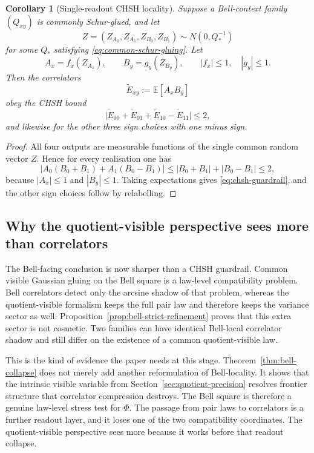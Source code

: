 \documentclass[11pt]{article}
\numberwithin{equation}{section}
\theoremstyle{thmcompact}
\newtheorem{corollary}[theorem]{Corollary}
\theoremstyle{remark}
\begin{document}
\begin{corollary}[Single-readout CHSH locality]\label{cor:chsh-guardrail}
Suppose a Bell-context family $(Q_{xy})$ is commonly Schur-glued, and let
\[
Z=(Z_{A_0},Z_{A_1},Z_{B_0},Z_{B_1})\sim N(0,Q_\ast^{-1})
\]
for some $Q_\ast$ satisfying \eqref{eq:common-schur-gluing}. Let
\[
A_x=f_x(Z_{A_x}),\qquad B_y=g_y(Z_{B_y}),
\qquad |f_x|\le 1,\quad |g_y|\le 1.
\]
Then the correlators
\[
\widetilde E_{xy}:=\mathbb E[A_xB_y]
\]
obey the CHSH bound
\begin{equation}\label{eq:chsh-guardrail}
\bigl|\widetilde E_{00}+\widetilde E_{01}+\widetilde E_{10}-\widetilde E_{11}\bigr|\le 2,
\end{equation}
and likewise for the other three sign choices with one minus sign.
\end{corollary}

\begin{proof}
All four outputs are measurable functions of the single common random vector $Z$. Hence for every realisation one has
\[
\bigl|A_0(B_0+B_1)+A_1(B_0-B_1)\bigr|
\le |B_0+B_1|+|B_0-B_1|\le 2,
\]
because $|A_x|\le 1$ and $|B_y|\le 1$. Taking expectations gives \eqref{eq:chsh-guardrail}, and the other sign choices follow by relabelling.
\end{proof}

\subsection{Why the quotient-visible perspective sees more than correlators}

The Bell-facing conclusion is now sharper than a CHSH guardrail. Common visible Gaussian gluing on the Bell square is a law-level compatibility problem. Bell correlators detect only the arcsine shadow of that problem, whereas the quotient-visible formalism keeps the full pair law and therefore keeps the variance sector as well. Proposition~\ref{prop:bell-strict-refinement} proves that this extra sector is not cosmetic. Two families can have identical Bell-local correlator shadow and still differ on the existence of a common quotient-visible law.

This is the kind of evidence the paper needs at this stage. Theorem~\ref{thm:bell-collapse} does not merely add another reformulation of Bell-locality. It shows that the intrinsic visible variable from Section~\ref{sec:quotient-precision} resolves frontier structure that correlator compression destroys. The Bell square is therefore a genuine law-level stress test for $\Phi$. The passage from pair laws to correlators is a further readout layer, and it loses one of the two compatibility coordinates. The quotient-visible perspective sees more because it works before that readout collapse.
\end{document}
